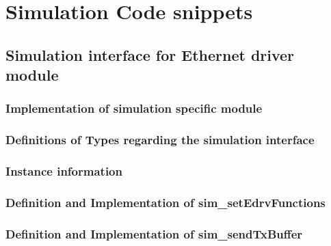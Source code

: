 \chapter{Simulation Code snippets}
\label{app:simulation}

\section{Simulation interface for Ethernet driver module}
\label{app:simulation_edrv}

\subsection{Implementation of simulation specific module}
\label{app:simulation_edrv_target}


\subsection{Definitions of Types regarding the simulation interface}
\label{app:simulation_edrv_functions}


\subsection{Instance information}
\label{app:simulation_edrv_interface_instance}



\subsection{Definition and Implementation of sim\_setEdrvFunctions}
\label{app:simulation_edrv_interface_setfunc}




\subsection{Definition and Implementation of sim\_sendTxBuffer}
\label{app:simulation_edrv_interface_sendtx}




